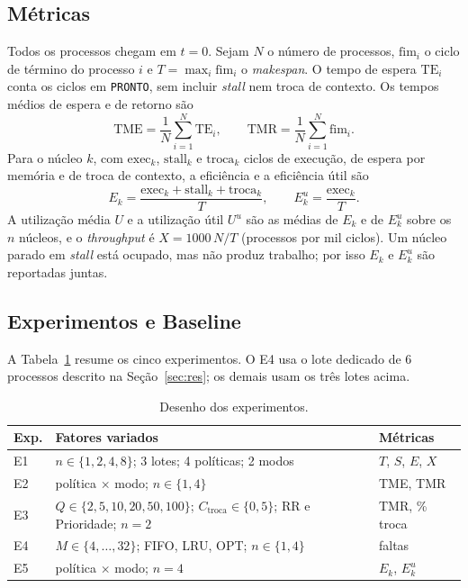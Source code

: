 \documentclass[conference]{IEEEtran}
\begin{document}
\subsection{Métricas}
Todos os processos chegam em $t = 0$. Sejam $N$ o número de processos, $\text{fim}_i$ o ciclo de término do processo $i$ e $T = \max_i \text{fim}_i$ o \textit{makespan}. O tempo de espera $\text{TE}_i$ conta os ciclos em \texttt{PRONTO}, sem incluir \textit{stall} nem troca de contexto. Os tempos médios de espera e de retorno são
\begin{equation}
\text{TME} = \frac{1}{N}\sum_{i=1}^{N} \text{TE}_i, \qquad \text{TMR} = \frac{1}{N}\sum_{i=1}^{N} \text{fim}_i .
\end{equation}
Para o núcleo $k$, com $\text{exec}_k$, $\text{stall}_k$ e $\text{troca}_k$ ciclos de execução, de espera por memória e de troca de contexto, a eficiência e a eficiência útil são
\begin{equation}
E_k = \frac{\text{exec}_k + \text{stall}_k + \text{troca}_k}{T}, \qquad E^{u}_k = \frac{\text{exec}_k}{T}.
\end{equation}
A utilização média $U$ e a utilização útil $U^{u}$ são as médias de $E_k$ e de $E^{u}_k$ sobre os $n$ núcleos, e o \textit{throughput} é $X = 1000\,N/T$ (processos por mil ciclos). Um núcleo parado em \textit{stall} está ocupado, mas não produz trabalho; por isso $E_k$ e $E^{u}_k$ são reportadas juntas.

\subsection{Experimentos e Baseline}
A Tabela~\ref{tab:exp} resume os cinco experimentos. O E4 usa o lote dedicado de 6 processos descrito na Seção~\ref{sec:res}; os demais usam os três lotes acima.

\begin{table}[htbp]
\caption{Desenho dos experimentos.}
\label{tab:exp}
\centering
\footnotesize
\begin{tabular}{@{}lp{4.5cm}l@{}}
\toprule
\textbf{Exp.} & \textbf{Fatores variados} & \textbf{Métricas} \\
\midrule
E1 & $n \in \{1,2,4,8\}$; 3 lotes; 4 políticas; 2 modos & $T$, $S$, $E$, $X$ \\
E2 & política $\times$ modo; $n \in \{1,4\}$ & TME, TMR \\
E3 & $Q \in \{2,5,10,20,50,100\}$; $C_{\text{troca}} \in \{0,5\}$; RR e Prioridade; $n=2$ & TMR, \% troca \\
E4 & $M \in \{4,\dots,32\}$; FIFO, LRU, OPT; $n \in \{1,4\}$ & faltas \\
E5 & política $\times$ modo; $n=4$ & $E_k$, $E^u_k$ \\
\bottomrule
\end{tabular}
\end{table}
\end{document}
